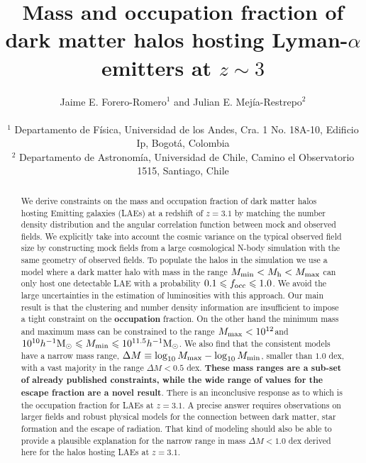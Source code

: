 \documentclass[usenatbib]{mn2e}
\newcommand{\ly}{{\ifmmode{{\rm Ly}\alpha}\else{Ly$\alpha$~}\fi}}
\newcommand{\hMsun}{{\ifmmode{h^{-1}{\rm
        {M_{\odot}}}}\else{$h^{-1}{\rm{M_{\odot}}}$}\fi}}
\begin{document}
\title[Halo mass and occupation fraction of LAEs at$z=3.1$]{Mass and
  occupation fraction of dark matter halos hosting Lyman-$\alpha$
  emitters at $z\sim 3$}      
\author[~J.~E. Forero-Romero and ~J.~E. Mejia-Restrepo]{
\parbox[t]{\textwidth}{\raggedright 
  Jaime E. Forero-Romero$^{1}$ and
  Julian E. Mej\'ia-Restrepo$^{2}$ 
}
\vspace*{6pt}\\
$^{1}$ Departamento de F\'{i}sica, Universidad de los Andes, Cra. 1
No. 18A-10, Edificio Ip, Bogot\'a, Colombia \\
$^{2}$ Departamento de Astronom\'{i}a, Universidad de Chile, Camino el
Observatorio 1515, Santiago, Chile} 

\maketitle

\begin{abstract}
%
We derive constraints on the mass and occupation fraction of dark
matter halos hosting \ly Emitting galaxies (LAEs) at a redshift of
$z=3.1$ by matching the number density distribution and the angular
correlation function between mock and observed fields. We explicitly
take into account the cosmic variance on the typical observed field
size by constructing mock fields from a large cosmological N-body
simulation with the same geometry of observed fields. To populate the
halos in the simulation we use a model where a dark matter halo with
mass in the range $M_{\rm min}<M_{\rm h}<M_{\rm max}$ can only host
one detectable LAE with a probability $0.1 \leq f_{\rm occ}\leq
1.0$. We avoid the large uncertainties in the estimation of \ly
luminosities with this approach. Our main result is that the
clustering and number density information are insufficient to impose a
tight constraint on the {\bf   occupation} fraction. On the other hand
the minimum mass and maximum mass can be constrained to the range $M_{\rm max}<10^{12}$\hMsun and $10^{10}\hMsun\leq M_{\rm min}\leq
10^{11.5}\hMsun$.  We also find that the consistent models have a narrow mass
range, $\Delta M \equiv \log_{10}M_{\rm max} - \log_{10} M_{\rm min}$,
smaller than $1.0$ dex, with a vast majority in the range $\Delta
M<0.5$ dex. {\bf These mass ranges are a sub-set of already published
constraints, while the wide range of values for the escape fraction
  are a novel result}. There is an inconclusive response as to
which is the occupation fraction for LAEs at $z=3.1$. A precise answer
requires observations on larger fields and robust physical models for
the connection between dark matter, star formation and the escape of
\ly radiation. That kind of modeling should also be able to provide a
plausible explanation for the narrow range in mass $\Delta M<1.0$ dex
derived here for the halos hosting LAEs at $z=3.1$.     

\end{abstract}
\end{document}

